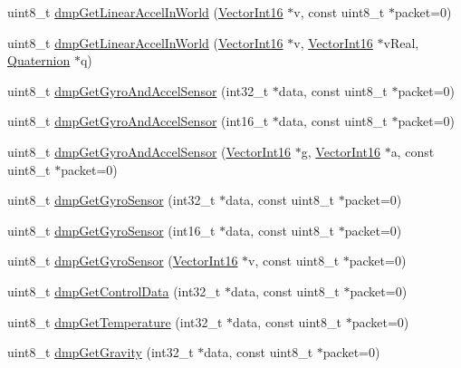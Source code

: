 \begin{DoxyCompactItemize}
\item 
uint8\+\_\+t \mbox{\hyperlink{classMPU6050_a848b210e89382c1f7c7fb3ee679b3852}{dmp\+Get\+Linear\+Accel\+In\+World}} (\mbox{\hyperlink{classVectorInt16}{Vector\+Int16}} $\ast$v, const uint8\+\_\+t $\ast$packet=0)
\item 
uint8\+\_\+t \mbox{\hyperlink{classMPU6050_a6c09e9168261daff945d1e0757598b61}{dmp\+Get\+Linear\+Accel\+In\+World}} (\mbox{\hyperlink{classVectorInt16}{Vector\+Int16}} $\ast$v, \mbox{\hyperlink{classVectorInt16}{Vector\+Int16}} $\ast$v\+Real, \mbox{\hyperlink{classQuaternion}{Quaternion}} $\ast$q)
\item 
uint8\+\_\+t \mbox{\hyperlink{classMPU6050_acf5f700d018798475b93d56652e39788}{dmp\+Get\+Gyro\+And\+Accel\+Sensor}} (int32\+\_\+t $\ast$data, const uint8\+\_\+t $\ast$packet=0)
\item 
uint8\+\_\+t \mbox{\hyperlink{classMPU6050_ad8caffca939574f73c7c300baee339b7}{dmp\+Get\+Gyro\+And\+Accel\+Sensor}} (int16\+\_\+t $\ast$data, const uint8\+\_\+t $\ast$packet=0)
\item 
uint8\+\_\+t \mbox{\hyperlink{classMPU6050_a13b5eff727ce232fef884ee67df4487f}{dmp\+Get\+Gyro\+And\+Accel\+Sensor}} (\mbox{\hyperlink{classVectorInt16}{Vector\+Int16}} $\ast$g, \mbox{\hyperlink{classVectorInt16}{Vector\+Int16}} $\ast$a, const uint8\+\_\+t $\ast$packet=0)
\item 
uint8\+\_\+t \mbox{\hyperlink{classMPU6050_adfe0bc92f57cf489583d5c3b07d7aefb}{dmp\+Get\+Gyro\+Sensor}} (int32\+\_\+t $\ast$data, const uint8\+\_\+t $\ast$packet=0)
\item 
uint8\+\_\+t \mbox{\hyperlink{classMPU6050_a1c79849a8c39eb918945e98aea1dd878}{dmp\+Get\+Gyro\+Sensor}} (int16\+\_\+t $\ast$data, const uint8\+\_\+t $\ast$packet=0)
\item 
uint8\+\_\+t \mbox{\hyperlink{classMPU6050_ad77de2fac9ea2b9c5e94aa245670fe48}{dmp\+Get\+Gyro\+Sensor}} (\mbox{\hyperlink{classVectorInt16}{Vector\+Int16}} $\ast$v, const uint8\+\_\+t $\ast$packet=0)
\item 
uint8\+\_\+t \mbox{\hyperlink{classMPU6050_a7c11e874e2f0009503e0014dd2b1bf85}{dmp\+Get\+Control\+Data}} (int32\+\_\+t $\ast$data, const uint8\+\_\+t $\ast$packet=0)
\item 
uint8\+\_\+t \mbox{\hyperlink{classMPU6050_a799f73f0eb419057b5fe2a02d7f1905d}{dmp\+Get\+Temperature}} (int32\+\_\+t $\ast$data, const uint8\+\_\+t $\ast$packet=0)
\item 
uint8\+\_\+t \mbox{\hyperlink{classMPU6050_a4411714ec5a1bb90e4c224d5e9d98b56}{dmp\+Get\+Gravity}} (int32\+\_\+t $\ast$data, const uint8\+\_\+t $\ast$packet=0)

\end{DoxyCompactItemize}

